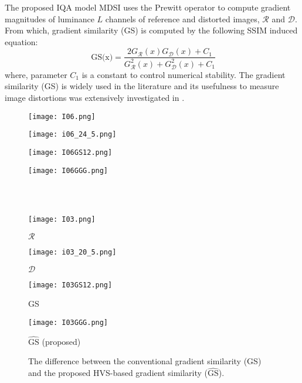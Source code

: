 The proposed IQA model MDSI uses the Prewitt operator to compute gradient magnitudes of luminance $L$ channels of reference and distorted images, $\mathcal{R}$ and $\mathcal{D}$. From which, gradient similarity (GS) is computed by the following SSIM induced equation:
\begin{equation}
  \ \text{GS(x)}=\frac{2 G_\mathcal{R}(x) G_\mathcal{D}(x) + C_1} {G_\mathcal{R}^2(x) + G_\mathcal{D}^2(x) + C_1}
  \label{GS}
\end{equation}                    
where, parameter $C_1$ is a constant to control numerical stability. The gradient similarity (GS) is widely used in the literature \cite{GSSIM, gradient2010, GS, FSIM, GMSD, VSI} and its usefulness to measure image distortions was extensively investigated in \cite{GMSD}. 




\begin{figure*}[htb]
\scriptsize
\begin{minipage}[b]{0.245\linewidth}
  \centering
  \centerline{\texttt{[image: I06.png]}} 
\end{minipage}
\begin{minipage}[b]{0.245\linewidth}
  \centering
  \centerline{\texttt{[image: i06\_24\_5.png]}}
\end{minipage}
\begin{minipage}[b]{0.245\linewidth}
  \centering
  \centerline{\texttt{[image: I06GS12.png]}}
\end{minipage}
\begin{minipage}[b]{0.245\linewidth}
  \centering
  \centerline{\texttt{[image: I06GGG.png]}} 
\end{minipage}
\\ \\
\begin{minipage}[b]{0.245\linewidth}
  \centering
  \centerline{\texttt{[image: I03.png]}}
  \vspace{0.10cm}
\centerline{$\mathcal{R}$}
\end{minipage}
\begin{minipage}[b]{0.245\linewidth}
  \centering
  \centerline{\texttt{[image: i03\_20\_5.png]}}
  \vspace{0.10cm}
\centerline{$\mathcal{D}$}
\end{minipage}
\begin{minipage}[b]{0.245\linewidth}
  \centering
  \centerline{\texttt{[image: I03GS12.png]}}
  \vspace{0.10cm}
\centerline{GS}
\end{minipage}
\begin{minipage}[b]{0.245\linewidth}
  \centering
  \centerline{\texttt{[image: I03GGG.png]}}
  \vspace{0.10cm}
\centerline{$\widehat{\text{GS}}$ (proposed)}
\end{minipage}
\caption{The difference between the conventional gradient similarity (GS) and the proposed HVS-based gradient similarity ($\widehat{\text{GS}}$).}
\label{GShvs}
\end{figure*}




